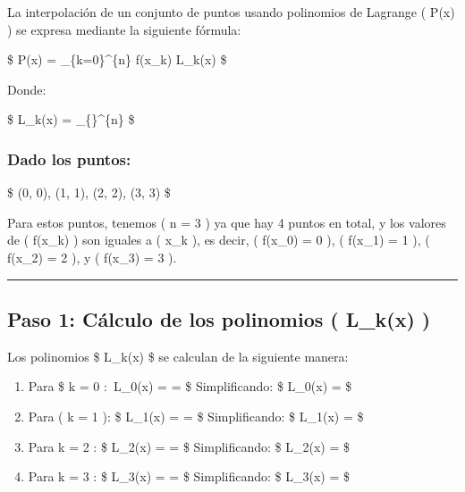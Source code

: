 \documentclass[
  letterpaper,
  DIV=11,
  numbers=noendperiod]{scrartcl}
\begin{document}
La interpolación de un conjunto de puntos usando polinomios de Lagrange
( P(x) ) se expresa mediante la siguiente fórmula:

\$ P(x) = \sum\_\{k=0\}\^{}\{n\} f(x\_k) L\_k(x) \$

Donde:

\$ L\_k(x) = \prod\_\{\}\^{}\{n\}
 \$

\subsubsection{Dado los puntos:}\label{dado-los-puntos}

\$ (0, 0), \quad (1, 1), \quad (2, 2), \quad (3, 3) \$

Para estos puntos, tenemos ( n = 3 ) ya que hay 4 puntos en total, y los
valores de ( f(x\_k) ) son iguales a ( x\_k ), es decir, ( f(x\_0) = 0
), ( f(x\_1) = 1 ), ( f(x\_2) = 2 ), y ( f(x\_3) = 3 ).

\begin{center}\rule{0.5\linewidth}{0.5pt}\end{center}

\subsection{Paso 1: Cálculo de los polinomios ( L\_k(x)
)}\label{paso-1-cuxe1lculo-de-los-polinomios-l_kx}

Los polinomios \$ L\_k(x) \$ se calculan de la siguiente manera:

\begin{enumerate}
\def\labelenumi{\arabic{enumi}.}
\item
  Para \$ k = 0 \(:\) L\_0(x) =
   =
   \$ Simplificando: \$ L\_0(x) =
   \$
\item
  Para ( k = 1 ): \$ L\_1(x) =
   =
   \$ Simplificando: \$ L\_1(x) =
   \$
\item
  Para k = 2 : \$ L\_2(x) =
   =
   \$ Simplificando: \$ L\_2(x) =
   \$
\item
  Para k = 3 : \$ L\_3(x) =
   =
   \$ Simplificando: \$ L\_3(x) =
   \$
\end{enumerate}
\end{document}
